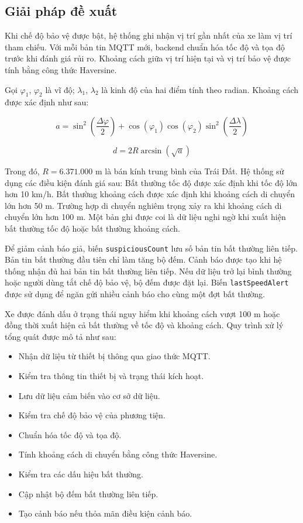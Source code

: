 \documentclass[../DoAn.tex]{subfiles}
\begin{document}
\subsection{Giải pháp đề xuất}

Khi chế độ bảo vệ được bật, hệ thống ghi nhận vị trí gần nhất của xe làm vị trí
tham chiếu. Với mỗi bản tin MQTT mới, backend chuẩn hóa tốc độ và tọa độ trước
khi đánh giá rủi ro. Khoảng cách giữa vị trí hiện tại và vị trí bảo vệ được tính
bằng công thức Haversine.

Gọi $\varphi_1$, $\varphi_2$ là vĩ độ; $\lambda_1$, $\lambda_2$ là kinh độ của
hai điểm tính theo radian. Khoảng cách được xác định như sau:

\begin{equation}
 a = \sin^2\left(\frac{\Delta\varphi}{2}\right)
 + \cos(\varphi_1)\cos(\varphi_2)
 \sin^2\left(\frac{\Delta\lambda}{2}\right)
\end{equation}

\begin{equation}
 d = 2R\arcsin(\sqrt{a})
\end{equation}

Trong đó, $R = 6.371.000$ m là bán kính trung bình của Trái Đất. Hệ thống sử
dụng các điều kiện đánh giá sau:
Bất thường tốc độ được xác định khi tốc độ lớn hơn 10 km/h. Bất thường khoảng cách được xác định khi khoảng cách di chuyển lớn hơn 50 m. Trường hợp di chuyển nghiêm trọng xảy ra khi khoảng cách di chuyển lớn hơn 100 m. Một bản ghi được coi là dữ liệu nghi ngờ khi xuất hiện bất thường tốc độ hoặc bất thường khoảng cách.

Để giảm cảnh báo giả, biến \texttt{suspiciousCount} lưu số bản tin bất thường
liên tiếp. Bản tin bất thường đầu tiên chỉ làm tăng bộ đếm. Cảnh báo được tạo khi
hệ thống nhận đủ hai bản tin bất thường liên tiếp. Nếu dữ liệu trở lại bình
thường hoặc người dùng tắt chế độ bảo vệ, bộ đếm được đặt lại. Biến
\texttt{lastSpeedAlert} được sử dụng để ngăn gửi nhiều cảnh báo cho cùng một
đợt bất thường.

Xe được đánh dấu ở trạng thái nguy hiểm khi khoảng cách vượt 100 m hoặc đồng
thời xuất hiện cả bất thường về tốc độ và khoảng cách. Quy trình xử lý tổng quát
được mô tả như sau:

\begin{itemize}
\item Nhận dữ liệu từ thiết bị thông qua giao thức MQTT.
\item Kiểm tra thông tin thiết bị và trạng thái kích hoạt.
\item Lưu dữ liệu cảm biến vào cơ sở dữ liệu.
\item Kiểm tra chế độ bảo vệ của phương tiện.
\item Chuẩn hóa tốc độ và tọa độ.
\item Tính khoảng cách di chuyển bằng công thức Haversine.
\item Kiểm tra các dấu hiệu bất thường.
\item Cập nhật bộ đếm bất thường liên tiếp.
\item Tạo cảnh báo nếu thỏa mãn điều kiện cảnh báo.
\end{itemize}
\end{document}
